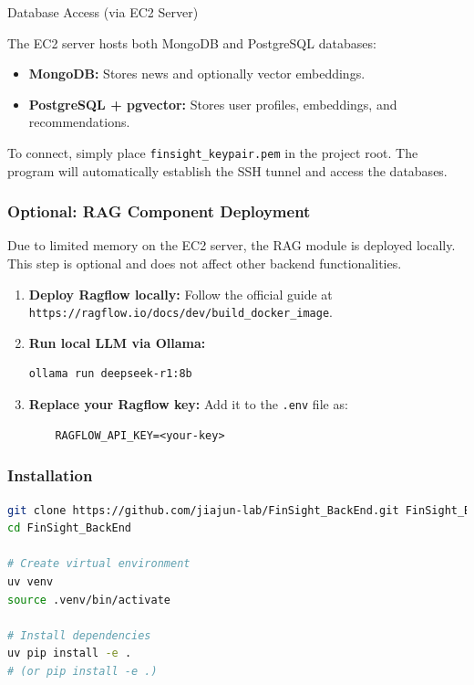 Database Access (via EC2 Server)

The EC2 server hosts both MongoDB and PostgreSQL databases:

\begin{itemize}
    \item \textbf{MongoDB:} Stores news and optionally vector embeddings.
    \item \textbf{PostgreSQL + pgvector:} Stores user profiles, embeddings, and recommendations.
\end{itemize}

To connect, simply place \texttt{finsight\_keypair.pem} in the project root.  
The program will automatically establish the SSH tunnel and access the databases.

\subsubsection{Optional: RAG Component Deployment}

Due to limited memory on the EC2 server, the RAG module is deployed locally.  
This step is optional and does not affect other backend functionalities.

\begin{enumerate}
    \item \textbf{Deploy Ragflow locally:} Follow the official guide at \texttt{https://ragflow.io/docs/dev/build\_docker\_image}.
    \item \textbf{Run local LLM via Ollama:}
    \begin{lstlisting}[language=bash]
    ollama run deepseek-r1:8b
    \end{lstlisting}
    \item \textbf{Replace your Ragflow key:}  
    Add it to the \texttt{.env} file as:
    \begin{lstlisting}
    RAGFLOW_API_KEY=<your-key>
    \end{lstlisting}
\end{enumerate}

\subsubsection{Installation}

\begin{lstlisting}[language=bash]
git clone https://github.com/jiajun-lab/FinSight_BackEnd.git FinSight_BackEnd
cd FinSight_BackEnd

# Create virtual environment
uv venv
source .venv/bin/activate

# Install dependencies
uv pip install -e .
# (or pip install -e .)
\end{lstlisting}

